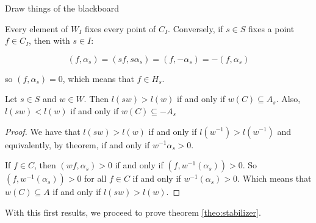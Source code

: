 \begin{example}
  Draw things of the blackboard
\end{example}

\begin{remark}
  Every element of $W_I$ fixes every point of $C_I$. Conversely, if $s \in S$ fixes a point $f \in C_I$, then with $s\in I$:

  \begin{equation}
    (f,\alpha_s) = (sf, s\alpha_s) = (f, -\alpha_s) = -(f,\alpha_s)
  \end{equation}

  so $(f,\alpha_s) = 0$, which means that $f \in H_s$.
\end{remark}

\begin{lemma}
  Let $s \in S$ and $w \in W$. Then $l(sw) > l(w)$ if and only if $w(C) \subseteq A_s$. Also, $l(sw) < l(w)$ if and only if $w(C) \subseteq -A_s$
\end{lemma}

\begin{proof}
  We have that $l(sw) > l(w)$ if and only if $l(w^{-1}) > l(w^{-1})$ and equivalently, by theorem, if and only if $w^{-1}\alpha_s > 0$.

  If $f \in C$, then $(wf, \alpha_s) > 0$ if and only if $(f, w^{-1}(\alpha_s)) > 0$. So $(f, w^{-1}(\alpha_s)) > 0$ for all $f \in C$ if and only if $w^{-1}(\alpha_s) > 0$. Which means that $w(C) \subseteq A$ if and only if $l(sw) > l(w)$.
\end{proof}

With this first results, we proceed to prove theorem \ref{theo:stabilizer}.


